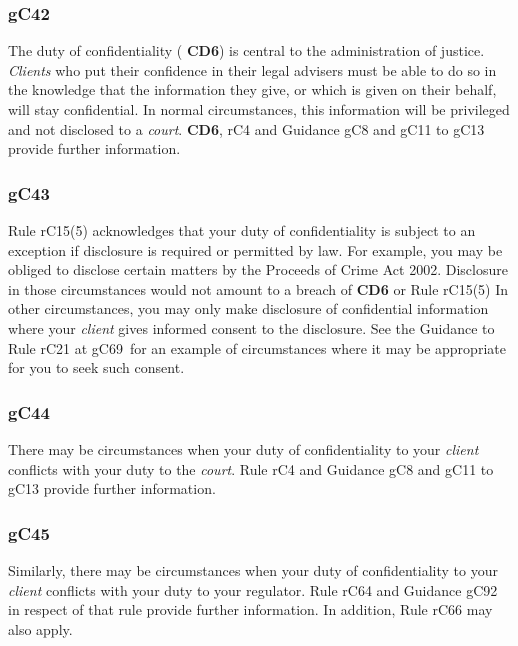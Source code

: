 \subsubsection{\color{darkgrey}gC42}

The duty of confidentiality ( \textbf{\textcolor{mygold}{CD6}}) is central to the administration of
justice. \emph{Clients} who put their confidence in their legal advisers
must be able to do so in the knowledge that the information they give,
or which is given on their behalf, will stay confidential. In normal
circumstances, this information will be privileged and not disclosed to
a \emph{court}.  \textbf{\textcolor{mygold}{CD6}}, rC4 and Guidance gC8 and gC11 to gC13 provide
further information.

\subsubsection{\color{darkgrey}gC43}

Rule rC15(5) acknowledges that your duty of confidentiality is subject to
an exception if disclosure is required or permitted by law. For example,
you may be obliged to disclose certain matters by the Proceeds of Crime
Act 2002. Disclosure in those circumstances would not amount to a breach
of  \textbf{\textcolor{mygold}{CD6}} or Rule rC15(5) In other circumstances, you may only make
disclosure of confidential information where your \emph{client} gives
informed consent to the disclosure. See the Guidance to Rule rC21 at
gC69~for an example of circumstances where it may be appropriate for you
to seek such consent.

\subsubsection{\color{darkgrey}gC44}

There may be circumstances when your duty of confidentiality to your
\emph{client} conflicts with your duty to the \emph{court}. Rule rC4 and
Guidance gC8 and gC11 to gC13 provide further information.

\subsubsection{\color{darkgrey}gC45}

Similarly, there may be circumstances when your duty of confidentiality
to your \emph{client} conflicts with your duty to your regulator. Rule
rC64 and Guidance gC92 in respect of that rule provide further
information. In addition, Rule rC66 may also apply.

